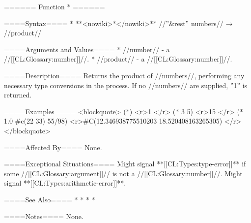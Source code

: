 ====== Function * ======

====Syntax====
  * **<nowiki>*</nowiki>** //''&rest'' numbers// → //product//

====Arguments and Values====
  * //number// - a //[[CL:Glossary:number]]//.
  * //product// - a //[[CL:Glossary:number]]//.

====Description====
Returns the product of //numbers//, performing any necessary type conversions in the process. If no //numbers// are supplied, ''1'' is returned.

====Examples====
<blockquote> 
(*) <r>1 </r>
(* 3 5) <r>15 </r>
(* 1.0 #c(22 33) 55/98) <r>#C(12.346938775510203 18.520408163265305) </r>
</blockquote>

====Affected By====
None.

====Exceptional Situations====
Might signal **[[CL:Types:type-error]]** if some //[[CL:Glossary:argument]]// is not a //[[CL:Glossary:number]]//. Might signal **[[CL:Types:arithmetic-error]]**.

====See Also====
  * {\secref\NumericOperations}
  * {\secref\RationalComputations}
  * {\secref\FloatingPointComputations}
  * {\secref\ComplexComputations}

====Notes====
None.

